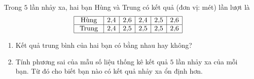 \begin{bt}%
	Trong $5$ lần nhảy xa, hai bạn Hùng và Trung có kết quả (đơn vị: mét) lần lượt là
	$$	\begin{array}{|c|c|c|c|c|c|}
		\hline \text { Hùng } & 2{,}4 & 2{,}6 & 2{,}4 & 2{,}5 & 2{,}6 \\
		\hline \text { Trung } & 2{,}4 & 2{,}5 & 2{,}5 & 2{,}5 & 2{,}6 \\
		\hline
	\end{array}$$
	\begin{enumerate}
		\item  Kết quả trung bình của hai bạn có bằng nhau hay không?
		\item Tính phương sai của mẫu số liệu thống kê kết quả $5$ lần nhảy xa của mỗi bạn. Từ đó cho biết bạn nào có kết quả nhảy xa ổn định hơn.
	\end{enumerate}
\end{bt}

